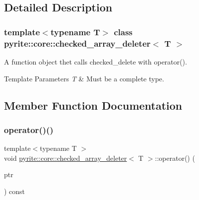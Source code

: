 \subsection{Detailed Description}
\subsubsection*{template$<$typename T$>$\newline
class pyrite\+::core\+::checked\+\_\+array\+\_\+deleter$<$ T $>$}

A function object thet calls checked\+\_\+delete with operator(). 
\begin{DoxyTemplParams}{Template Parameters}
{\em T} & Must be a complete type. \\
\hline
\end{DoxyTemplParams}


\subsection{Member Function Documentation}
\mbox{\label{classpyrite_1_1core_1_1checked__array__deleter_a9ac9321cdd986f83350ab5707f9ed4b4}} 
\subsubsection{\texorpdfstring{operator()()}{operator()()}}
{\footnotesize\ttfamily template$<$typename T $>$ \\
void \mbox{\hyperlink{classpyrite_1_1core_1_1checked__array__deleter}{pyrite\+::core\+::checked\+\_\+array\+\_\+deleter}}$<$ T $>$\+::operator() (\begin{DoxyParamCaption}\item[{T $\ast$\&}]{ptr }\end{DoxyParamCaption}) const\hspace{0.3cm}{\ttfamily [inline]}}

